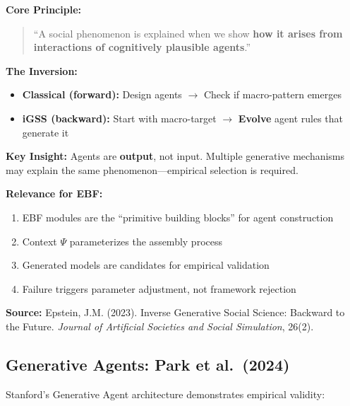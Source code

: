 \begin{tcolorbox}[colback=orange!5!white, colframe=orange!75!black,
    title=\textbf{Epstein (2023): Inverse Generative Social Science}]

\textbf{Core Principle:}
\begin{quote}
``A social phenomenon is explained when we show \textbf{how it arises from interactions
of cognitively plausible agents}.''
\end{quote}

\textbf{The Inversion:}
\begin{itemize}[nosep]
    \item \textbf{Classical (forward):} Design agents $\rightarrow$ Check if macro-pattern emerges
    \item \textbf{iGSS (backward):} Start with macro-target $\rightarrow$ \textbf{Evolve} agent rules that generate it
\end{itemize}

\textbf{Key Insight:} Agents are \textbf{output}, not input. Multiple generative mechanisms
may explain the same phenomenon---empirical selection is required.

\textbf{Relevance for EBF:}
\begin{enumerate}[nosep]
    \item EBF modules are the ``primitive building blocks'' for agent construction
    \item Context $\Psi$ parameterizes the assembly process
    \item Generated models are candidates for empirical validation
    \item Failure triggers parameter adjustment, not framework rejection
\end{enumerate}

\textbf{Source:} Epstein, J.M. (2023). Inverse Generative Social Science: Backward to the Future.
\textit{Journal of Artificial Societies and Social Simulation}, 26(2).

\end{tcolorbox}

\subsection{Generative Agents: Park et al.\ (2024)}

Stanford's Generative Agent architecture demonstrates empirical validity:

